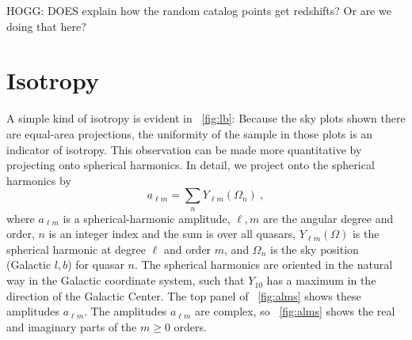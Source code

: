 \documentclass[modern]{aastex631}
\newcommand{\figref}[1]{\figurename~\ref{#1}}
\begin{document}
HOGG: DOES \cite{ksf} explain how the random catalog points get redshifts? Or are we doing that here?

\section{Isotropy}\label{sec:iso}\noindent
A simple kind of isotropy is evident in \figref{fig:lb}:
Because the sky plots shown there are equal-area projections, the uniformity of the sample in those plots is an indicator of isotropy.
This observation can be made more quantitative by projecting onto spherical harmonics.
In detail, we project onto the spherical harmonics by
\begin{equation}\label{eq:alms}
    a_{\ell m} = \sum_n Y_{\ell m}(\Omega_n) ~,
\end{equation}
where $a_{\ell m}$ is a spherical-harmonic amplitude,
$\ell, m$ are the angular degree and order,
$n$ is an integer index and the sum is over all quasars,
$Y_{\ell m}(\Omega)$ is the spherical harmonic at degree $\ell$ and order $m$,
and
$\Omega_n$ is the sky position (Galactic $l, b$) for quasar $n$.
The spherical harmonics are oriented in the natural way in the Galactic coordinate system, such that $Y_{10}$ has a maximum in the direction of the Galactic Center.
The top panel of \figref{fig:alms} shows these amplitudes $a_{\ell m}$.
The amplitudes $a_{\ell m}$ are complex, so \figref{fig:alms} shows the real and imaginary parts of the $m\geq 0$ orders.
\end{document}
